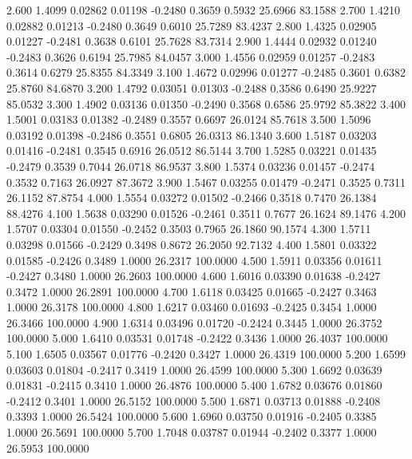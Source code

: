    2.600   1.4099   0.02862   0.01198  -0.2480   0.3659   0.5932  25.6966  83.1588
   2.700   1.4210   0.02882   0.01213  -0.2480   0.3649   0.6010  25.7289  83.4237
   2.800   1.4325   0.02905   0.01227  -0.2481   0.3638   0.6101  25.7628  83.7314
   2.900   1.4444   0.02932   0.01240  -0.2483   0.3626   0.6194  25.7985  84.0457
   3.000   1.4556   0.02959   0.01257  -0.2483   0.3614   0.6279  25.8355  84.3349
   3.100   1.4672   0.02996   0.01277  -0.2485   0.3601   0.6382  25.8760  84.6870
   3.200   1.4792   0.03051   0.01303  -0.2488   0.3586   0.6490  25.9227  85.0532
   3.300   1.4902   0.03136   0.01350  -0.2490   0.3568   0.6586  25.9792  85.3822
   3.400   1.5001   0.03183   0.01382  -0.2489   0.3557   0.6697  26.0124  85.7618
   3.500   1.5096   0.03192   0.01398  -0.2486   0.3551   0.6805  26.0313  86.1340
   3.600   1.5187   0.03203   0.01416  -0.2481   0.3545   0.6916  26.0512  86.5144
   3.700   1.5285   0.03221   0.01435  -0.2479   0.3539   0.7044  26.0718  86.9537
   3.800   1.5374   0.03236   0.01457  -0.2474   0.3532   0.7163  26.0927  87.3672
   3.900   1.5467   0.03255   0.01479  -0.2471   0.3525   0.7311  26.1152  87.8754
   4.000   1.5554   0.03272   0.01502  -0.2466   0.3518   0.7470  26.1384  88.4276
   4.100   1.5638   0.03290   0.01526  -0.2461   0.3511   0.7677  26.1624  89.1476
   4.200   1.5707   0.03304   0.01550  -0.2452   0.3503   0.7965  26.1860  90.1574
   4.300   1.5711   0.03298   0.01566  -0.2429   0.3498   0.8672  26.2050  92.7132
   4.400   1.5801   0.03322   0.01585  -0.2426   0.3489   1.0000  26.2317 100.0000
   4.500   1.5911   0.03356   0.01611  -0.2427   0.3480   1.0000  26.2603 100.0000
   4.600   1.6016   0.03390   0.01638  -0.2427   0.3472   1.0000  26.2891 100.0000
   4.700   1.6118   0.03425   0.01665  -0.2427   0.3463   1.0000  26.3178 100.0000
   4.800   1.6217   0.03460   0.01693  -0.2425   0.3454   1.0000  26.3466 100.0000
   4.900   1.6314   0.03496   0.01720  -0.2424   0.3445   1.0000  26.3752 100.0000
   5.000   1.6410   0.03531   0.01748  -0.2422   0.3436   1.0000  26.4037 100.0000
   5.100   1.6505   0.03567   0.01776  -0.2420   0.3427   1.0000  26.4319 100.0000
   5.200   1.6599   0.03603   0.01804  -0.2417   0.3419   1.0000  26.4599 100.0000
   5.300   1.6692   0.03639   0.01831  -0.2415   0.3410   1.0000  26.4876 100.0000
   5.400   1.6782   0.03676   0.01860  -0.2412   0.3401   1.0000  26.5152 100.0000
   5.500   1.6871   0.03713   0.01888  -0.2408   0.3393   1.0000  26.5424 100.0000
   5.600   1.6960   0.03750   0.01916  -0.2405   0.3385   1.0000  26.5691 100.0000
   5.700   1.7048   0.03787   0.01944  -0.2402   0.3377   1.0000  26.5953 100.0000
